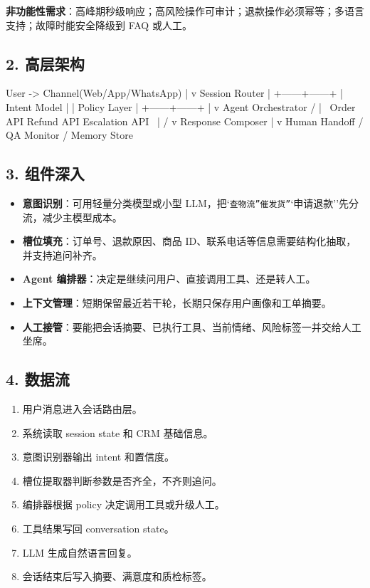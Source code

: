 \textbf{非功能性需求}：高峰期秒级响应；高风险操作可审计；退款操作必须幂等；多语言支持；故障时能安全降级到 FAQ 或人工。


\subsection{2. 高层架构}
\begin{codeblock}
User -> Channel(Web/App/WhatsApp)
          |
          v
      Session Router
          |
   +------+------+
   | Intent Model |
   | Policy Layer |
   +------+------+
          |
          v
      Agent Orchestrator
   /       |         \
Order API Refund API Escalation API
   \       |         /
          v
     Response Composer
          |
          v
 Human Handoff / QA Monitor / Memory Store
\end{codeblock}

\subsection{3. 组件深入}
\begin{itemize}[leftmargin=2em]
\item \textbf{意图识别}：可用轻量分类模型或小型 LLM，把`\texttt{查物流''}\texttt{催发货''}`申请退款''先分流，减少主模型成本。
\item \textbf{槽位填充}：订单号、退款原因、商品 ID、联系电话等信息需要结构化抽取，并支持追问补齐。
\item \textbf{Agent 编排器}：决定是继续问用户、直接调用工具、还是转人工。
\item \textbf{上下文管理}：短期保留最近若干轮，长期只保存用户画像和工单摘要。
\item \textbf{人工接管}：要能把会话摘要、已执行工具、当前情绪、风险标签一并交给人工坐席。
\end{itemize}

\subsection{4. 数据流}
\begin{enumerate}[leftmargin=2em]
\item 用户消息进入会话路由层。
\item 系统读取 session state 和 CRM 基础信息。
\item 意图识别器输出 intent 和置信度。
\item 槽位提取器判断参数是否齐全，不齐则追问。
\item 编排器根据 policy 决定调用工具或升级人工。
\item 工具结果写回 conversation state。
\item LLM 生成自然语言回复。
\item 会话结束后写入摘要、满意度和质检标签。
\end{enumerate}

